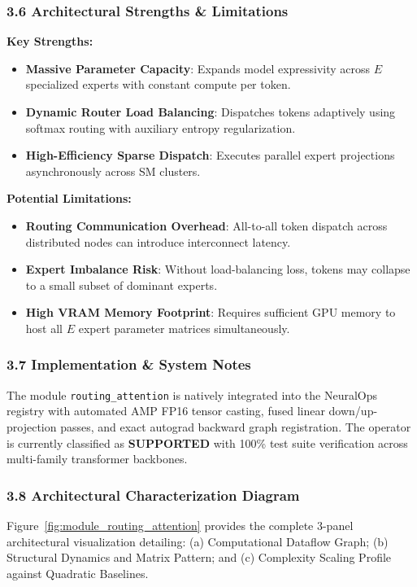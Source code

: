 \subsubsection*{3.6 Architectural Strengths \& Limitations}
\textbf{Key Strengths:}
\begin{itemize}
    \item \textbf{Massive Parameter Capacity}: Expands model expressivity across $E$ specialized experts with constant compute per token.
    \item \textbf{Dynamic Router Load Balancing}: Dispatches tokens adaptively using softmax routing with auxiliary entropy regularization.
    \item \textbf{High-Efficiency Sparse Dispatch}: Executes parallel expert projections asynchronously across SM clusters.
\end{itemize}

\textbf{Potential Limitations:}
\begin{itemize}
    \item \textbf{Routing Communication Overhead}: All-to-all token dispatch across distributed nodes can introduce interconnect latency.
    \item \textbf{Expert Imbalance Risk}: Without load-balancing loss, tokens may collapse to a small subset of dominant experts.
    \item \textbf{High VRAM Memory Footprint}: Requires sufficient GPU memory to host all $E$ expert parameter matrices simultaneously.
\end{itemize}

\subsubsection*{3.7 Implementation \& System Notes}
The module \texttt{routing\_attention} is natively integrated into the NeuralOps registry with automated AMP FP16 tensor casting, fused linear down/up-projection passes, and exact autograd backward graph registration. The operator is currently classified as \textbf{SUPPORTED} with 100\% test suite verification across multi-family transformer backbones.

\subsubsection*{3.8 Architectural Characterization Diagram}
Figure~\ref{fig:module_routing_attention} provides the complete 3-panel architectural visualization detailing: (a) Computational Dataflow Graph; (b) Structural Dynamics and Matrix Pattern; and (c) Complexity Scaling Profile against Quadratic Baselines.

